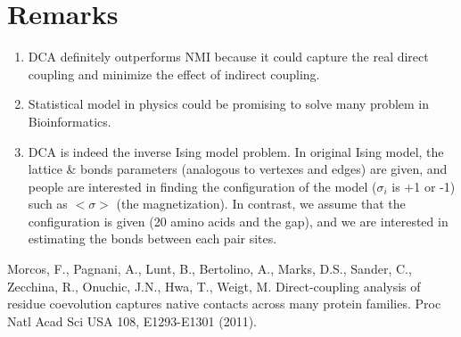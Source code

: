 \documentclass[a4paper,12pt]{article}
\begin{document}
\section*{Remarks}
\begin{enumerate}
\item
DCA definitely outperforms NMI because it could capture the real direct coupling and minimize the effect of indirect coupling.
\item
Statistical model in physics could be promising to solve many problem in Bioinformatics.
\item
DCA is indeed the inverse Ising model problem. In original Ising model, the lattice \& bonds parameters (analogous to vertexes and edges) are given, and people are interested in finding the configuration of the model ($\sigma_i $ is +1 or -1) such as $< \sigma>$ (the magnetization). In contrast, we assume that the configuration is given (20 amino acids and the gap), and we are interested in estimating the bonds between each pair sites. 

\end{enumerate}

\begin{thebibliography}{1}

   Morcos, F., Pagnani, A., Lunt, B., Bertolino, A., Marks, D.S., Sander, C., Zecchina, R., Onuchic, J.N., Hwa, T., Weigt, M. Direct-coupling analysis of residue coevolution captures native contacts across many protein families. Proc Natl Acad Sci USA 108, E1293-E1301 (2011).

  

  \end{thebibliography}
\end{document}
